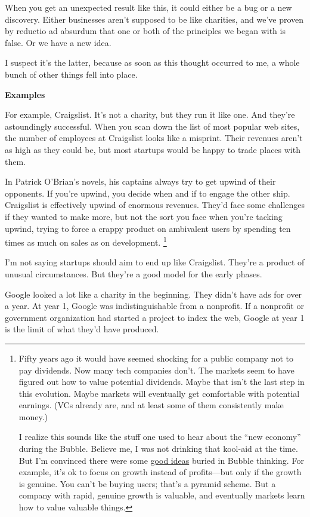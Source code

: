 \documentclass[12pt]{book}
\begin{document}
When you get an unexpected result like this, it could either be a bug or
a new discovery. Either businesses aren't supposed to be like charities,
and we've proven by reductio ad absurdum that one or both of the
principles we began with is false. Or we have a new idea.

I suspect it's the latter, because as soon as this thought occurred to
me, a whole bunch of other things fell into place.

\textbf{Examples}

For example, Craigslist. It's not a charity, but they run it like one.
And they're astoundingly successful. When you scan down the list of most
popular web sites, the number of employees at Craigslist looks like a
misprint. Their revenues aren't as high as they could be, but most
startups would be happy to trade places with them.

In Patrick O'Brian's novels, his captains always try to get upwind of
their opponents. If you're upwind, you decide when and if to engage the
other ship. Craigslist is effectively upwind of enormous revenues.
They'd face some challenges if they wanted to make more, but not the
sort you face when you're tacking upwind, trying to force a crappy
product on ambivalent users by spending ten times as much on sales as on
development. \footnote{Fifty years ago it would have seemed shocking for a public
company not to pay dividends. Now many tech companies don't. The markets
seem to have figured out how to value potential dividends. Maybe that
isn't the last step in this evolution. Maybe markets will eventually get
comfortable with potential earnings. (VCs already are, and at least some
of them consistently make money.)

I realize this sounds like the stuff one used to hear about the ``new
economy'' during the Bubble. Believe me, I was not drinking that
kool-aid at the time. But I'm convinced there were some
\href{bubble.html}{good ideas} buried in Bubble thinking. For example,
it's ok to focus on growth instead of profits---but only if the growth
is genuine. You can't be buying users; that's a pyramid scheme. But a
company with rapid, genuine growth is valuable, and eventually markets
learn how to value valuable things.}

I'm not saying startups should aim to end up like Craigslist. They're a
product of unusual circumstances. But they're a good model for the early
phases.

Google looked a lot like a charity in the beginning. They didn't have
ads for over a year. At year 1, Google was indistinguishable from a
nonprofit. If a nonprofit or government organization had started a
project to index the web, Google at year 1 is the limit of what they'd
have produced.
\end{document}
